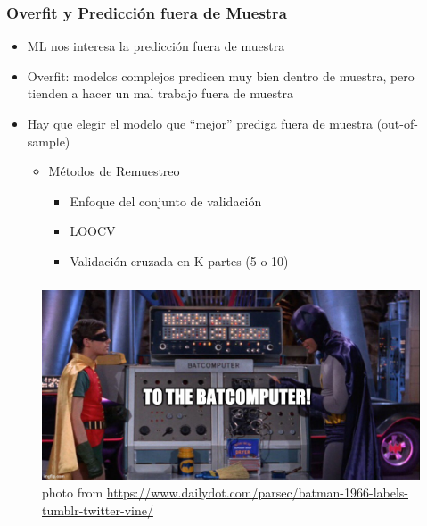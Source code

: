 \documentclass[
  shownotes,
  xcolor={svgnames},
  hyperref={colorlinks,citecolor=DarkBlue,linkcolor=andesred,urlcolor=DarkBlue}
  , aspectratio=169]{beamer}
\begin{document}
\begin{frame}
\frametitle{Overfit y Predicción fuera de Muestra}


\begin{itemize}
  \item ML nos interesa la predicción fuera de muestra
  \pause
  \medskip
  \item Overfit: modelos complejos predicen muy bien dentro de muestra, pero tienden a hacer un mal trabajo fuera de muestra 
  \medskip
  \item Hay que elegir el modelo que ``mejor'' prediga fuera de muestra (out-of-sample)
  \medskip

    \begin{itemize}
    \medskip
    \item Métodos de Remuestreo
    \medskip
      \begin{itemize}

        \item Enfoque del conjunto de validación
        \medskip
        \item LOOCV
        \medskip
        \item Validación cruzada en K-partes (5 o 10)
      \end{itemize}
    \end{itemize}

\end{itemize}

\end{frame}
\begin{frame}[fragile]
\frametitle{}
\begin{figure}[H] \centering
  \centering
  \includegraphics[scale=0.35]{figures/baticomputer_meme.jpg}
  \\
  \tiny photo from \url{https://www.dailydot.com/parsec/batman-1966-labels-tumblr-twitter-vine/}
\end{figure}

 \end{frame}
\end{document}
